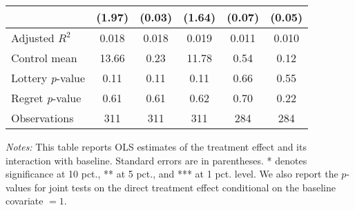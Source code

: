\begin{table}[htbp]
{\begin{threeparttable}
\begin{tabular}{l*{5}{c}}
                &   (1.97)         &   (0.03)         &   (1.64)         &   (0.07)         &   (0.05)         \\
\midrule
Adjusted \(R^{2}\)&    0.018         &    0.018         &    0.019         &    0.011         &    0.010         \\
Control mean    &    13.66         &     0.23         &    11.78         &     0.54         &     0.12         \\
Lottery \emph{p}-value&     0.11         &     0.11         &     0.11         &     0.66         &     0.55         \\
Regret \emph{p}-value&     0.61         &     0.61         &     0.62         &     0.70         &     0.22         \\
Observations    &      311         &      311         &      311         &      284         &      284         \\
\bottomrule \end{tabular} \begin{tablenotes}[flushleft] \footnotesize \item \emph{Notes:} This table reports OLS estimates of the treatment effect and its interaction with baseline. Standard errors are in parentheses. * denotes significance at 10 pct., ** at 5 pct., and *** at 1 pct. level. We also report the \(p\)-values for joint tests on the direct treatment effect conditional on the baseline covariate $= 1$. \end{tablenotes} \end{threeparttable} } \end{table}

